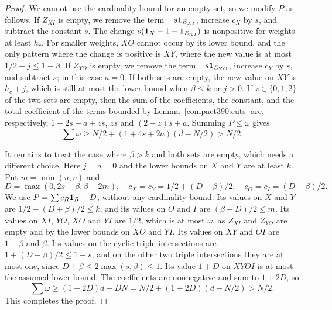 \begin{proof}
We cannot use the cardinality bound for an empty set, so we modify $P$ as follows. If $Z_{XI}$ is empty, we remove the term $-s\mathbf 1_{E_{XI}}$, increase $c_X$ by $s$,
and subtract the constant $s$. The change
$s(\mathbf 1_X-1+\mathbf 1_{E_{XI}})$ is nonpositive for weights at least $h_c$.
For smaller weights, $XO$ cannot occur by its lower bound, and the only
pattern where the change is positive is $XY$, where the new value is
at most $1/2+j\le1-\beta$. If $Z_{YO}$ is empty, we remove the term $-s\mathbf 1_{E_{YO}}$, increase $c_Y$ by $s$,
and subtract $s$; in this case $a=0$. If both sets are empty,
the new value on $XY$ is $h_c+j$, which is still at most the lower bound when $\beta\le k$
or $j>0$. If $z\in\{0,1,2\}$ of the two sets are empty, then the sum of the coefficients, the
constant, and the total coefficient of the terms bounded by Lemma~\ref{compact390:cuts} are, respectively,
$1+2s+a+zs$, $zs$ and $(2-z)s+a$. Summing $P\le\omega$ gives
\[
 \sum\omega\ge N/2+(1+4s+2a)(d-N/2)>N/2.
\]

It remains to treat the case where $\beta>k$ and both sets are empty, which needs a different choice.
Here $j=a=0$ and the lower bounds on $X$ and $Y$ are at least $k$.
Put $m=\min(u,v)$ and
\[
 D=\max(0,2s-\beta,\beta-2m),\quad
 c_X=c_Y=1/2+(D-\beta)/2,\quad c_O=c_I=(D+\beta)/2.
\]
We use $P=\sum c_R\mathbf 1_R-D$, without any cardinality bound. Its values on $X$ and $Y$
are $1/2-(D+\beta)/2\le k$, and its values on $O$ and $I$ are $(\beta-D)/2\le m$.
Its values on $XI$, $YO$, $XO$ and $YI$ are $1/2$, which is at most $\omega$, as $Z_{XI}$ and $Z_{YO}$ are empty and by the lower bounds on $XO$ and $YI$. Its values on $XY$ and $OI$ are $1-\beta$ and $\beta$.
Its values on the cyclic triple intersections are $1+(D-\beta)/2\le1+s$, and on the other two triple intersections they
are at most one, since $D+\beta\le2\max(s,\beta)\le1$.
Its value $1+D$ on $XYOI$ is at most the assumed lower bound. The coefficients
are nonnegative and sum to $1+2D$, so
\[
 \sum\omega\ge(1+2D)d-DN
             =N/2+(1+2D)(d-N/2)>N/2.
\]
This completes the proof.
\end{proof}

